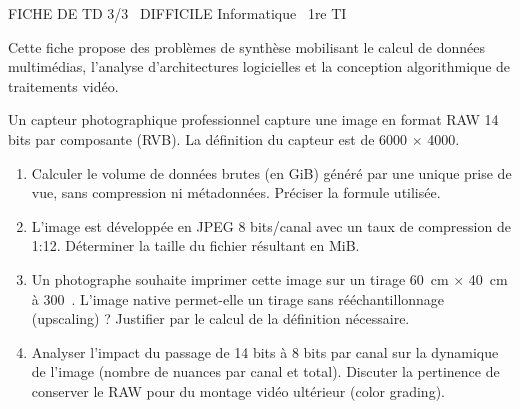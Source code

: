 \documentclass[11pt]{article}
\begin{document}
\begin{tcolorbox}[enhanced,colback=popink,colframe=popink,arc=10pt,boxrule=0pt,left=12pt,right=12pt,top=9pt,bottom=9pt]
{\color{white}\popxbold\small FICHE DE TD 3/3 \textbullet\ DIFFICILE \hfill Informatique \textbullet\ 1re TI\par}
\end{tcolorbox}
\vspace{4pt}
Cette fiche propose des problèmes de synthèse mobilisant le calcul de données multimédias, l'analyse d'architectures logicielles et la conception algorithmique de traitements vidéo.

\begin{exercice}
Un capteur photographique professionnel capture une image en format RAW 14 bits par composante (RVB). La définition du capteur est de \SI{6000}{} $\times$ \SI{4000}{}.
\begin{enumerate}
    \item Calculer le volume de données brutes (en \unit{GiB}) généré par une unique prise de vue, sans compression ni métadonnées. Préciser la formule utilisée.
    \item L'image est développée en JPEG 8 bits/canal avec un taux de compression de 1:12. Déterminer la taille du fichier résultant en \unit{MiB}.
    \item Un photographe souhaite imprimer cette image sur un tirage \SI{60}{cm} $\times$ \SI{40}{cm} à 300~. L'image native permet-elle un tirage sans rééchantillonnage (upscaling) ? Justifier par le calcul de la définition nécessaire.
    \item Analyser l'impact du passage de 14 bits à 8 bits par canal sur la dynamique de l'image (nombre de nuances par canal et total). Discuter la pertinence de conserver le RAW pour du montage vidéo ultérieur (color grading).
\end{enumerate}
\end{exercice}
\end{document}
